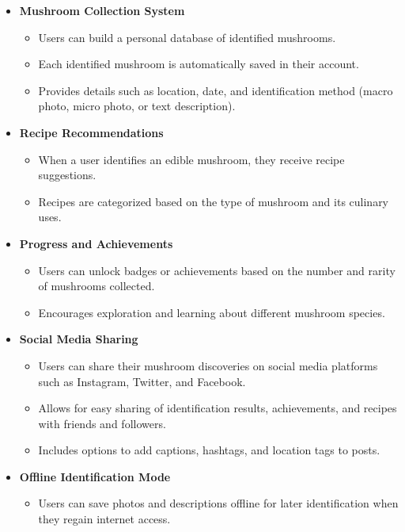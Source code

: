 \documentclass{article}
\begin{document}
\begin{itemize}
    \item \textbf{Mushroom Collection System}  
    \begin{itemize}
        \item Users can build a personal database of identified mushrooms.
        \item Each identified mushroom is automatically saved in their account.
        \item Provides details such as location, date, and identification method (macro photo, micro photo, or text description).
    \end{itemize}

    \item \textbf{Recipe Recommendations}  
    \begin{itemize}
        \item When a user identifies an edible mushroom, they receive recipe suggestions.
        \item Recipes are categorized based on the type of mushroom and its culinary uses.
    \end{itemize}

    \item \textbf{Progress and Achievements}  
    \begin{itemize}
        \item Users can unlock badges or achievements based on the number and rarity of mushrooms collected.
        \item Encourages exploration and learning about different mushroom species.
    \end{itemize}

    \item \textbf{Social Media Sharing}  
    \begin{itemize}
        \item Users can share their mushroom discoveries on social media platforms such as Instagram, Twitter, and Facebook.
        \item Allows for easy sharing of identification results, achievements, and recipes with friends and followers.
        \item Includes options to add captions, hashtags, and location tags to posts.
    \end{itemize}

    \item \textbf{Offline Identification Mode}  
    \begin{itemize}
        \item Users can save photos and descriptions offline for later identification when they regain internet access.
    \end{itemize}
\end{itemize}
\end{document}
